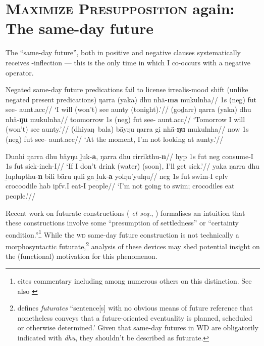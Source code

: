 \section[\textsc{\textit{MaxPresupp 2}}: The same-day future]{\textsc{Maximize Presupposition} again:\\The same-day future}\label{yolngu-sdf}


The ``same-day future'', both in positive and negative clauses systematically receives \I-inflection --- this is the only time in which \gls{I} co-occurs with a negative operator.

\pex Negated same-day future predications fail to license irrealis-mood shift (unlike negated present predications)\trailingcitation{[AW~20190501]}
\a\begingl\gla ŋarra (yaka) dhu nhä-\textbf{ma} mukulnha//
\glb 1s (\gls{neg}) \gls{fut} see-\I{} aunt.\gls{acc}//
\glft `I will (won't) see aunty (tonight).'//\endgl
\a \begingl\gla (goḏarr) ŋarra (yaka) dhu nhä-\textbf{ŋu} mukulnha//
\glb toomorrow 1s (\gls{neg}) \gls{fut} see-\II{} aunt.\gls{acc}//
\glft `Tomorrow I will (won't) see aunty.'//\endgl
\a\begingl\gla (dhiyaŋ~bala) bäyŋu ŋarra gi nhä-\textbf{ŋu} mukulnha//
\glb now 1s (\gls{neg}) \gls{fut} see-\II{} aunt.\gls{acc}//
\glft `At the moment, I'm not looking at aunty.'//\endgl
\xe

\pex
\a\begingl\gla Ŋunhi ŋarra dhu bäyŋu ḻuk-\textbf{a}, ŋarra dhu rirrikthu-\textbf{n}//
\glb \gls{hyp} 1s \gls{fut} \gls{neg} consume-\gls{I} 1s \gls{fut} sick-\gls{inch}-\gls{I}//
\glft`If I don't drink (water) (soon), I'll get sick.'\trailingcitation{[AW~20190409]}//
\endgl
\a\begingl\gla yaka ŋarra dhu ḻuplupthu-\textbf{n} bili bäru ŋuli ga ḻuk-\textbf{a} yolŋu'yulŋu//
\glb \gls{neg} 1s \gls{fut} swim-\gls{I} \gls{cplv} crocoodile \gls{hab} \gls{ipfv}.\gls{I} eat-\gls{I} people//
\glft`I'm not going to swim; crocodiles eat people.'\trailingcitation{[AW~20190428]}//
\endgl\xe

Recent work on futurate constructions (\citealp[see e.g.,][]{Copley2009,Copley2008a} \textit{et seq.}, \citealp{Kaufmann2002,Kaufmann2005}) formalises an intuition that these constructions involve some ``presumption of settledness'' or ``certainty condition.''\footnote{\citet{Kaufmann2002} cites commentary including \citet{Dowty1979,Comrie1985} among numerous others on this distinction. See also \citet[note 1]{Copley2008a}} While the \textsc{wd} same-day future construction is not technically a morphosyntactic futurate,\footnote{\citet[261]{Copley2008a} defines \textit{futurates} ``sentence[s] with no obvious means of future reference that nonetheless conveys that a future-oriented eventuality is planned, scheduled or otherwise determined.' Given that same-day futures in WD are obligatorily indicated with \textit{dhu}, they shouldn't be described as futurate.} analysis of these devices may shed potential insight on the (functional) motivation for this phenomenon.

